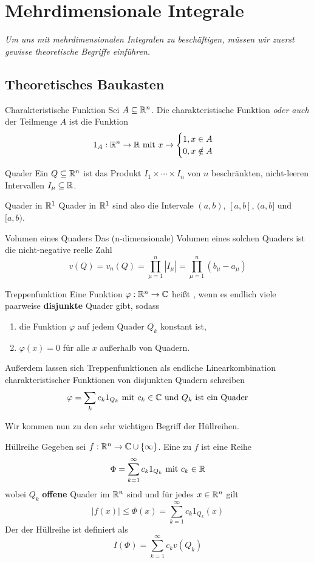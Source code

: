 \newpage
\section[Einführung in die Gebietsintegrale]{Mehrdimensionale Integrale}
\textit{Um uns mit mehrdimensionalen Integralen zu beschäftigen, müssen wir zuerst gewisse theoretische Begriffe einführen.}
\subsection{Theoretisches Baukasten}

\begin{Def}{Charakteristische Funktion}
Sei $A\subseteq \mathbb{R}^n$. Die charakteristische Funktion \textit{oder auch}  der Teilmenge $A$ ist die Funktion
$$1_A:\mathbb{R}^n \rightarrow \mathbb{R} \mbox{ mit } x\rightarrow \begin{cases}1, x\in A \\
0, x\notin A\end{cases}$$
\end{Def}
\begin{Def}{Quader}
Ein  $Q\subseteq \mathbb{R}^n$ ist das Produkt $I_1\times \cdots \times I_n$ von $n$ beschränkten, nicht-leeren Intervallen $I_\mu \subseteq \mathbb{R}$.
\end{Def}
\begin{Beispiel}{Quader in $\mathbb{R}^1$}
Quader in $\mathbb{R}^1$ sind also die Intervale $(a,b)$, $[a,b]$, $(a,b]$ und $[a,b)$. \\
\end{Beispiel}
\begin{Def}{Volumen eines Quaders}
Das (n-dimensionale) Volumen eines solchen Quaders ist die nicht-negative reelle Zahl
$$v(Q)=v_n(Q)=\prod_{\mu = 1}^n |I_\mu|=\prod_{\mu = 1}^n (b_\mu - a_\mu)$$
\end{Def}
\begin{Def}{Treppenfunktion}
Eine Funktion $\varphi:\mathbb{R}^n \rightarrow \mathbb{C}$ heißt , wenn es endlich viele paarweise \textbf{disjunkte} Quader gibt, sodass
\begin{enumerate}
    \item die Funktion $\varphi$ auf jedem Quader $Q_k$ konstant ist,
    \item $\varphi(x)=0$ für alle $x$ außerhalb von Quadern.
    \end{enumerate}
Außerdem lassen sich Treppenfunktionen als endliche Linearkombination charakteristischer Funktionen von disjunkten Quadern schreiben
$$\varphi=\sum_{k}c_k 1_{Q_k} \mbox{ mit $c_k\in \mathbb{C}$ und $Q_k$ ist ein Quader}$$ 
\end{Def}
Wir kommen nun zu den sehr wichtigen Begriff der Hüllreihen.
\begin{Def}{Hüllreihe}
Gegeben sei $f:\mathbb{R}^n\rightarrow\mathbb{C}\cup \{\infty\}$. Eine  zu $f$ ist eine Reihe
$$\Phi=\sum_{k=1}^\infty c_k1_{Q_k} \mbox{ mit $c_k\in \mathbb{R}$}$$
wobei $Q_k$ \textbf{offene} Quader im $\mathbb{R}^n$ sind und für jedes $x\in\mathbb{R}^n$ gilt
$$|f(x)|\leq \Phi(x) = \sum_{k=1}^\infty c_k1_{Q_k}(x)$$
Der  der Hüllreihe ist definiert als
$$I(\Phi) = \sum_{k=1}^\infty c_k v(Q_k)$$
\end{Def}

